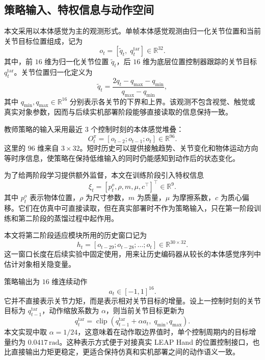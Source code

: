 \subsection{策略输入、特权信息与动作空间}
\thesisbodyfont
本文采用以本体感觉为主的观测形式。单帧本体感觉观测由归一化关节位置和当前关节目标位置组成，记为
\begin{equation}
o_t =
\left[
\tilde q_t,\;
q_t^{\mathrm{tar}}
\right]
\in \mathbb{R}^{32}.
\end{equation}
其中，前 \(16\) 维为归一化关节位置 \(\tilde q_t\)，后 \(16\) 维为底层位置控制器跟踪的关节目标 \(q_t^{\mathrm{tar}}\)。关节位置归一化定义为
\begin{equation}
\tilde q_t
=
\frac{2q_t-q_{\max}-q_{\min}}{q_{\max}-q_{\min}},
\end{equation}
其中 \(q_{\min},q_{\max}\in\mathbb{R}^{16}\) 分别表示各关节的下界和上界。该观测不包含视觉、触觉或真实对象参数，因而与后续实机部署阶段能够直接读取的信息保持一致。

教师策略的输入采用最近 \(3\) 个控制时刻的本体感觉堆叠：
\begin{equation}
O_t^\pi =
\left[
o_{t-2};o_{t-1};o_t
\right]
\in \mathbb{R}^{96}.
\end{equation}
这里的 \(96\) 维来自 \(3\times 32\)。短时历史可以提供接触趋势、关节变化和物体运动方向等时序信息，使策略在保持低维输入的同时仍能感知到动作后的状态变化。

为了给两阶段学习提供额外监督，本文在训练阶段引入特权信息
\begin{equation}
\xi_t =
\left[
p_t^o,\rho,m,\mu,c^\top
\right]^\top
\in \mathbb{R}^{9}.
\end{equation}
其中 \(p_t^o\) 表示物体位置，\(\rho\) 为尺寸参数，\(m\) 为质量，\(\mu\) 为摩擦系数，\(c\) 为质心偏移。它们在仿真中可直接读取，但在真实部署时不作为策略输入，只在第一阶段训练和第二阶段的蒸馏过程中起作用。

本文将第二阶段适应模块所用的历史窗口记为
\begin{equation}
h_t =
\left[
o_{t-29};o_{t-28};\ldots;o_t
\right]
\in \mathbb{R}^{30\times 32}.
\end{equation}
这一窗口长度在后续实验中固定使用，用来让历史编码器从较长的本体感觉序列中估计对象相关隐变量。

策略输出为 \(16\) 维连续动作
\begin{equation}
a_t \in [-1,1]^{16}.
\end{equation}
它并不直接表示关节力矩，而是表示相对关节目标的增量。设上一控制时刻的关节目标为 \(q_{t-1}^{\mathrm{tar}}\)，动作缩放系数为 \(\alpha\)，则当前关节目标更新为
\begin{equation}
q_t^{\mathrm{tar}}=
\operatorname{clip}\!\left(
q_{t-1}^{\mathrm{tar}}+\alpha a_t,\;
q_{\min}, q_{\max}
\right).
\end{equation}
本文实现中取 \(\alpha=1/24\)，这意味着在动作取边界值时，单个控制周期内的目标增量约为 \(0.0417\,\mathrm{rad}\)。这种表示方式便于对接真实 LEAP Hand 的位置控制接口，也比直接输出力矩更稳定，更适合保持仿真和实机部署之间的动作语义一致。

